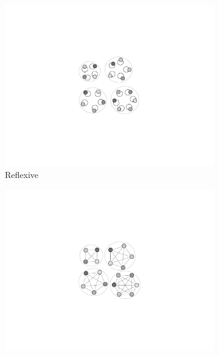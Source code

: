 \begin{figure}[h]
    \centering
    \begin{subfigure}{0.25\textwidth}
        \centering
        \includegraphics[scale=0.3]{figures/reflex_updated}
            \caption{Reflexive}
            \label{fig:reflexive}
    \end{subfigure}%
    \begin{subfigure}{0.27\textwidth}
        \centering
        \includegraphics[scale=0.3]{figures/Contrast_circle}

\end{subfigure}
\end{figure}
